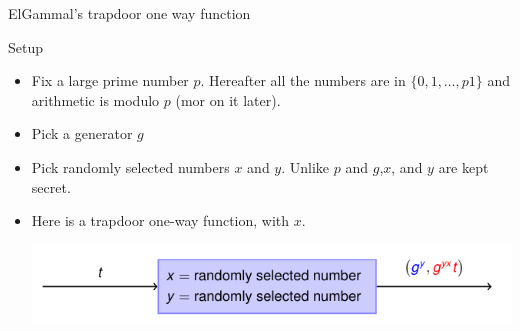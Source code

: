 \begin{parag}{ElGammal's trapdoor one way function}
    \begin{subparag}{Setup}
        \begin{itemize}
            \item Fix a large prime number $p$. Hereafter all the numbers are in $\{0, 1, \dots, p1\}$ and arithmetic is modulo $p$ (mor on it later).
            \item Pick a generator $g$
            \item Pick randomly selected numbers $x$ and $y$. Unlike $p$ and $g$,$x$, and $y$ are kept secret.\\
            \item  Here is a trapdoor one-way function, with  $x$.
                \begin{center}
                    \includegraphics[scale=0.5]{32025-03-19.png}
                \end{center}
        \end{itemize}
        

\end{subparag}
\end{parag}
